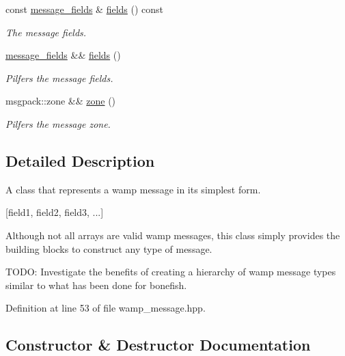 \begin{DoxyCompactItemize}
const \hyperlink{classautobahn_1_1wamp__message_a2986ec144b289c128508c0e839d81147}{message\+\_\+fields} \& \hyperlink{classautobahn_1_1wamp__message_a7101933c7dadd25ba5f022854b53d3d8}{fields} () const 
\begin{DoxyCompactList}\small\item\em The message fields. \end{DoxyCompactList}\item 
\hyperlink{classautobahn_1_1wamp__message_a2986ec144b289c128508c0e839d81147}{message\+\_\+fields} \&\& \hyperlink{classautobahn_1_1wamp__message_ab6e1cb7105986914cc602986789a7a61}{fields} ()
\begin{DoxyCompactList}\small\item\em Pilfers the message fields. \end{DoxyCompactList}\item 
msgpack\+::zone \&\& \hyperlink{classautobahn_1_1wamp__message_ae8db458e6c133012e4caceefb56ff263}{zone} ()
\begin{DoxyCompactList}\small\item\em Pilfers the message zone. \end{DoxyCompactList}\end{DoxyCompactItemize}


\subsection{Detailed Description}
A class that represents a wamp message in its simplest form. 

\mbox{[}field1, field2, field3, ...\mbox{]}

Although not all arrays are valid wamp messages, this class simply provides the building blocks to construct any type of message.

T\+O\+DO\+: Investigate the benefits of creating a hierarchy of wamp message types similar to what has been done for bonefish. 

Definition at line 53 of file wamp\+\_\+message.\+hpp.



\subsection{Constructor \& Destructor Documentation}
